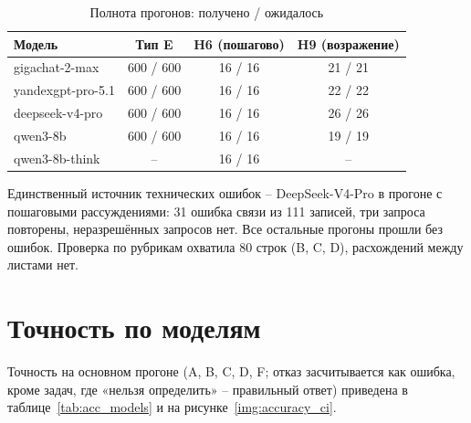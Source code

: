 \documentclass{bmstu}
\begin{document}
\begin{table}[htbp]
\centering
\caption{Полнота прогонов: получено / ожидалось}
\label{tab:coverage}
\begin{tabular}{|l|c|c|c|}
\hline
Модель & Тип E & H6 (пошагово) & H9 (возражение) \\
\hline
gigachat-2-max & 600 / 600 & 16 / 16 & 21 / 21 \\
yandexgpt-pro-5.1 & 600 / 600 & 16 / 16 & 22 / 22 \\
deepseek-v4-pro & 600 / 600 & 16 / 16 & 26 / 26 \\
qwen3-8b & 600 / 600 & 16 / 16 & 19 / 19 \\
qwen3-8b-think & -- & 16 / 16 & -- \\
\hline
\end{tabular}
\vspace{-10pt}
\end{table}

Единственный источник технических ошибок -- DeepSeek-V4-Pro в прогоне с пошаговыми рассуждениями: 31 ошибка связи из 111 записей, три запроса повторены, неразрешённых запросов нет. Все остальные прогоны прошли без ошибок. Проверка по рубрикам охватила 80 строк (B, C, D), расхождений между листами нет.

\section{Точность по моделям}
Точность на основном прогоне (A, B, C, D, F; отказ засчитывается как ошибка, кроме задач, где «нельзя определить» -- правильный ответ) приведена в таблице~\ref{tab:acc_models} и на рисунке~\ref{img:accuracy_ci}.

\begin{table}[htbp]
\centering
\caption{Точность моделей с 95\% бутстреп-ДИ}
\label{tab:acc_models}
\vspace{-10pt}
\end{table}
\end{document}
